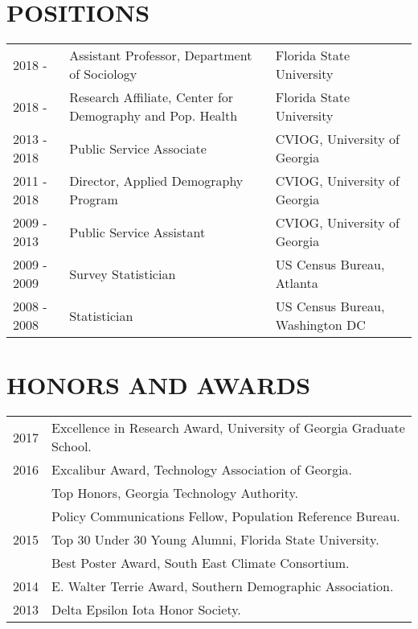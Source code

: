 \documentclass[letterpaper,11pt]{article}
\begin{document}
\section{POSITIONS}
\begin{tabular}{lll}
2018 - & Assistant Professor, Department of Sociology & Florida State University\\
2018 - & Research Affiliate, Center for Demography and Pop. Health & Florida State University\\
2013 - 2018 & Public Service Associate & CVIOG, University of Georgia\\
2011 - 2018 & Director, Applied Demography Program & CVIOG, University of Georgia\\
2009 - 2013 & Public Service Assistant & CVIOG, University of Georgia\\
2009 - 2009 & Survey Statistician & US Census Bureau, Atlanta\\
2008 - 2008 & Statistician & US Census Bureau, Washington DC\\
\end{tabular}


\section{HONORS AND AWARDS}
\begin{tabular}{ll}
2017 & Excellence in Research Award, University of Georgia Graduate School. \\
2016 & Excalibur Award, Technology Association of Georgia.\\
 & Top Honors, Georgia Technology Authority.\\
 & Policy Communications Fellow, Population Reference Bureau.\\
2015 & Top 30 Under 30 Young Alumni, Florida State University.\\
 & Best Poster Award, South East Climate Consortium.\\
2014 & E. Walter Terrie Award, Southern Demographic Association.\\
2013 & Delta Epsilon Iota Honor Society.\\
\end{tabular}
\end{document}
